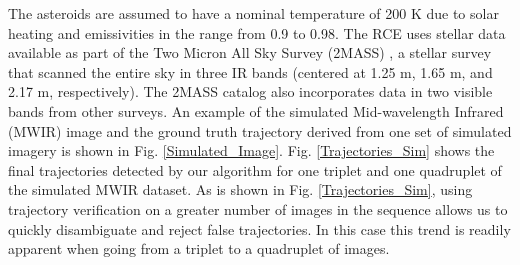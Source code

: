 
 The asteroids are assumed to have a nominal temperature of 200 K due to solar heating and emissivities in the range from 0.9 to 0.98. 
 The RCE uses stellar data available as part of the Two Micron All Sky Survey (2MASS) \cite{2MASS}, a stellar survey that scanned the entire sky in three IR bands (centered at 1.25 \textmu m, 1.65 \textmu m, and 2.17 \textmu m, respectively).  The 2MASS catalog also incorporates data in two visible bands from other surveys. 
 An example of the simulated Mid-wavelength Infrared (MWIR) image and the ground truth trajectory derived from one set of simulated imagery is shown in Fig. \ref{Simulated_Image}. 
 Fig. \ref{Trajectories_Sim} shows the final trajectories detected by our algorithm for one triplet and one quadruplet of the simulated MWIR dataset. As is shown in Fig. \ref{Trajectories_Sim}, using trajectory verification on a greater number of images in the sequence allows us to quickly disambiguate and reject false trajectories. In this case this trend is readily apparent when going from a triplet to a quadruplet of images.
%

